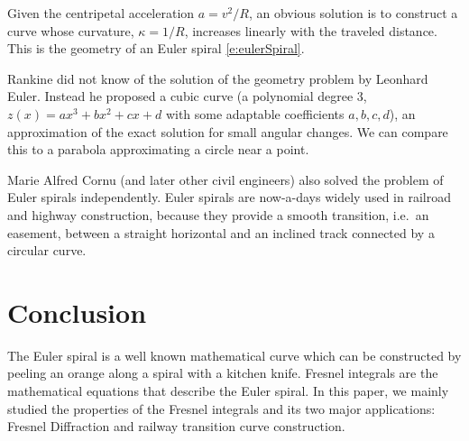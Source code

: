 \documentclass[12pt]{article}
\begin{document}
Given the centripetal acceleration $a=v^2/R$, an obvious solution is to construct a curve whose curvature, $\kappa=1/R$, increases linearly with the traveled distance. This is the geometry of an Euler spiral \eqref{e:eulerSpiral}.

Rankine did not know of the solution of the geometry problem by Leonhard Euler.  Instead he proposed a cubic curve (a polynomial degree 3, $z(x)=ax^3+bx^2+cx+d$ with some adaptable coefficients $a,b,c,d$), an approximation of the exact solution for small angular changes.   We can compare this to a parabola approximating a circle near a point.

Marie Alfred Cornu (and later other civil engineers) also solved the problem of Euler spirals independently. Euler spirals are now-a-days widely used in railroad and highway construction, because they provide a smooth transition, i.e.~an easement, between a straight horizontal and an inclined track connected by a circular curve.


\section{Conclusion}
The Euler spiral is a well known mathematical curve which can be constructed by peeling an orange along a spiral with a kitchen knife. Fresnel integrals are the mathematical equations that describe the Euler spiral. In this paper, we mainly studied the properties of the Fresnel integrals and its two major applications: Fresnel Diffraction and railway transition curve construction.




\end{document}
